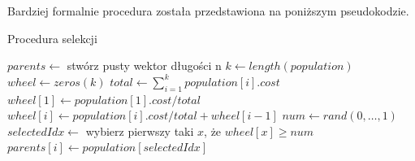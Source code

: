 Bardziej formalnie procedura została przedstawiona na poniższym pseudokodzie.

\begin{pseudokod}[H]
    \label{selekcja}
    \caption{Procedura selekcji}
    \BlankLine
    $parents \gets$ stwórz pusty wektor długości n\;
    $k \gets length(population)$\;
    $wheel \gets zeros(k)$
    \BlankLine
    $total \gets \sum_{i=1}^{k} population[i].cost$\;
    $wheel[1] \gets population[1].cost / total$\;
     {
        $wheel[i] \gets population[i].cost / total + wheel[i-1]$\;
    }
    \BlankLine
     {
        $num \gets rand(0,\dots, 1)$
        $selectedIdx \gets$ wybierz pierwszy taki $x$, że $wheel[x] \ge num$\;
        $parents[i] \gets population[selectedIdx]$\;
    }

\end{pseudokod}

